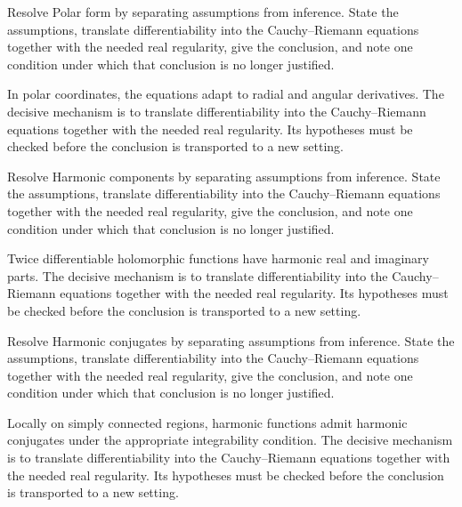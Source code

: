 \begin{problem}\label{prob:iv02-problem-04}
Resolve Polar form by separating assumptions from inference. State the assumptions, translate differentiability into the Cauchy--Riemann equations together with the needed real regularity, give the conclusion, and note one condition under which that conclusion is no longer justified.
\end{problem}
\begin{solution}
In polar coordinates, the equations adapt to radial and angular derivatives. The decisive mechanism is to translate differentiability into the Cauchy--Riemann equations together with the needed real regularity. Its hypotheses must be checked before the conclusion is transported to a new setting.
\end{solution}

\begin{problem}\label{prob:iv02-problem-05}
Resolve Harmonic components by separating assumptions from inference. State the assumptions, translate differentiability into the Cauchy--Riemann equations together with the needed real regularity, give the conclusion, and note one condition under which that conclusion is no longer justified.
\end{problem}
\begin{solution}
Twice differentiable holomorphic functions have harmonic real and imaginary parts. The decisive mechanism is to translate differentiability into the Cauchy--Riemann equations together with the needed real regularity. Its hypotheses must be checked before the conclusion is transported to a new setting.
\end{solution}

\begin{problem}\label{prob:iv02-problem-06}
Resolve Harmonic conjugates by separating assumptions from inference. State the assumptions, translate differentiability into the Cauchy--Riemann equations together with the needed real regularity, give the conclusion, and note one condition under which that conclusion is no longer justified.
\end{problem}
\begin{solution}
Locally on simply connected regions, harmonic functions admit harmonic conjugates under the appropriate integrability condition. The decisive mechanism is to translate differentiability into the Cauchy--Riemann equations together with the needed real regularity. Its hypotheses must be checked before the conclusion is transported to a new setting.
\end{solution}

